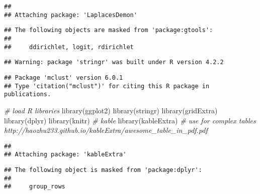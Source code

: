 \documentclass[
]{article}
\newenvironment{Shaded}{\begin{snugshade}}{\end{snugshade}}
\newcommand{\CommentTok}[1]{\textcolor[rgb]{0.56,0.35,0.01}{\textit{#1}}}
\newcommand{\FunctionTok}[1]{\textcolor[rgb]{0.00,0.00,0.00}{#1}}
\newcommand{\NormalTok}[1]{#1}
\begin{document}
\begin{verbatim}
## 
## Attaching package: 'LaplacesDemon'
\end{verbatim}

\begin{verbatim}
## The following objects are masked from 'package:gtools':
## 
##     ddirichlet, logit, rdirichlet
\end{verbatim}

\begin{verbatim}
## Warning: package 'stringr' was built under R version 4.2.2
\end{verbatim}

\begin{verbatim}
## Package 'mclust' version 6.0.1
## Type 'citation("mclust")' for citing this R package in publications.
\end{verbatim}

\begin{Shaded}
\begin{Highlighting}[]
\CommentTok{\# load R libraries}
\FunctionTok{library}\NormalTok{(ggplot2)}
\FunctionTok{library}\NormalTok{(stringr)}
\FunctionTok{library}\NormalTok{(gridExtra)}
\FunctionTok{library}\NormalTok{(dplyr)}
\FunctionTok{library}\NormalTok{(knitr) }\CommentTok{\# kable}
\FunctionTok{library}\NormalTok{(kableExtra) }\CommentTok{\# use for complex tables http://haozhu233.github.io/kableExtra/awesome\_table\_in\_pdf.pdf}
\end{Highlighting}
\end{Shaded}

\begin{verbatim}
## 
## Attaching package: 'kableExtra'
\end{verbatim}

\begin{verbatim}
## The following object is masked from 'package:dplyr':
## 
##     group_rows
\end{verbatim}
\end{document}
